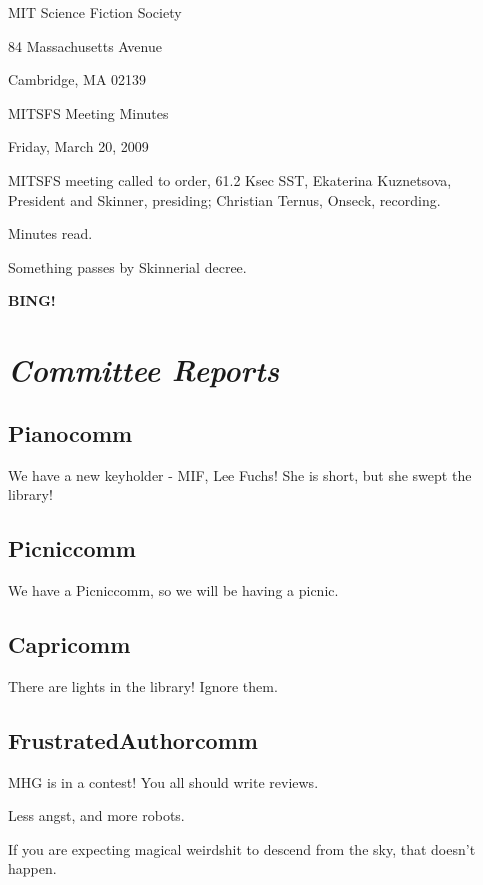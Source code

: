 \documentclass[10pt]{article}
\newcommand{\bing}{{\bf BING!} }
\newcommand{\goto}[1]{\bing \vskip 12pt \section*{{\em{#1}}}}
\begin{document}
\begin{center}

MIT Science Fiction Society

84 Massachusetts Avenue

Cambridge, MA 02139

\vspace{12pt}

MITSFS Meeting Minutes

Friday, March 20, 2009

\end{center}

\vspace{18pt}

\setlength{\parskip}{6pt}

\noindent
MITSFS meeting called to order, 61.2 Ksec SST,
Ekaterina Kuznetsova, President and Skinner, presiding; Christian Ternus, Onseck, recording.

Minutes read.

Something passes by Skinnerial decree.

\goto{Committee Reports}

\subsection*{Pianocomm}

We have a new keyholder - MIF, Lee Fuchs!  She is short, but she swept
the library!

\subsection*{Picniccomm}

We have a Picniccomm, so we will be having a picnic.

\subsection*{Capricomm}

There are lights in the library!  Ignore them.

\subsection*{FrustratedAuthorcomm}

MHG is in a contest!  You all should write reviews.

Less angst, and more robots.

If you are expecting magical weirdshit to descend from the sky, that
doesn't happen.  
\end{document}
